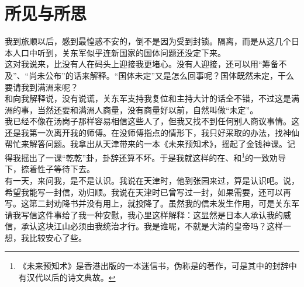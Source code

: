 \fancyhead[RO]{} %
\fancyhead[LE]{} %
\chapter*{所见与所思}
\thispagestyle{empty}
我到旅顺以后，感到最惶惑不安的，倒不是因为受到封锁。隔离，而是从这几个日本人口中听到，关东军似乎连新国家的国体问题还没定下来。\\

这对我说来，比没有人在码头上迎接我更堵心。没有人迎接，还可以用“筹备不及”、“尚未公布”的话来解释。“国体未定”又是怎么回事呢？国体既然未定，干么要请我到满洲来呢？\\

和向我解释说，没有说谎，关东军支持我复位和主持大计的话全不错，不过这是满洲的事，当然还要和满洲人商量，没有商量好以前，自然叫做“未定”。\\

我已经不像在汤岗子那样容易相信这些人了，但我又找不到任何别人商议事情。这还是我第一次离开我的师傅。在没师傅指点的情形下，我只好采取的办法，找神仙帮忙来解答问题。我拿出从天津带来的一本《未来预知术》，摇起了金钱神课。记得我摇出了一课“乾乾”卦，卦辞还算不坏。于是我就这样的在、和\footnote{《未来预知术》是香港出版的一本迷信书，伪称是的著作，可是其中的封辞中有汉代以后的诗文典故。}的一致劝导下，捺着性子等待下去。\\

有一天，来问我，是不是认识。我说在天津时，他到张园来过，算是认识吧。说，希望我能写一封信，劝归顺。我说在天津时已曾写过一封，如果需要，还可以再写。这第二封劝降书并没有用上，就投降了。虽然我的信未发生作用，可是关东军请我写信这件事给了我一种安慰，我心里这样解释：这显然是日本人承认我的威信，承认这块江山必须由我统治才行。我是谁呢，不就是大清的皇帝吗？这样一想，我比较安心了些。\\

